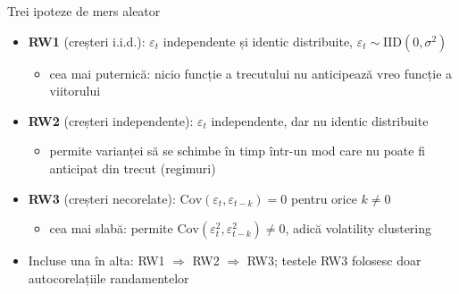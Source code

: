 \begin{frame}{Trei ipoteze de mers aleator}
\itemsize{\small}
\begin{itemize}
    \item \textbf{RW1} (creșteri i.i.d.): $\varepsilon_t$ independente și identic distribuite, $\varepsilon_t \sim \mathrm{IID}(0, \sigma^2)$ 
    \begin{itemize}
        \item cea mai puternică: nicio funcție a trecutului nu anticipează vreo funcție a viitorului
    \end{itemize}
    \item \textbf{RW2} (creșteri independente): $\varepsilon_t$ independente, dar nu identic distribuite
    \begin{itemize}
        \item permite varianței să se schimbe în timp într-un mod care nu poate fi anticipat din trecut (regimuri)
    \end{itemize}
    \item \textbf{RW3} (creșteri necorelate): $\mathrm{Cov}(\varepsilon_t, \varepsilon_{t-k}) = 0$ pentru orice $k \ne 0$
    \begin{itemize}
        \item cea mai slabă: permite $\mathrm{Cov}(\varepsilon_t^2, \varepsilon_{t-k}^2) \ne 0$, adică volatility clustering
    \end{itemize}
    \item Incluse una în alta: RW1 $\Rightarrow$ RW2 $\Rightarrow$ RW3; testele RW3 folosesc doar autocorelațiile randamentelor
\end{itemize}
\end{frame}

